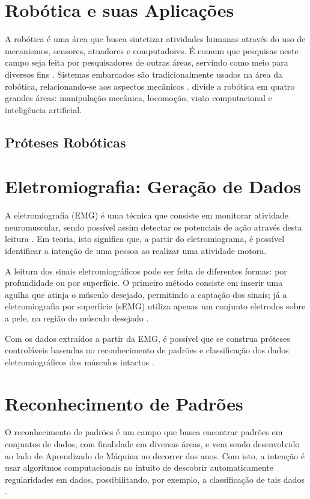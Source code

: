 \section{Robótica e suas Aplicações}
\label{sec:robotica}
A robótica é uma área que busca sintetizar atividades humanas através do uso de mecanismos, sensores, atuadores e computadores. É comum que pesquisas neste campo seja feita por pesquisadores de outras áreas, servindo como meio para diversos fins \cite{craig:2005}. Sistemas embarcados são tradicionalmente usados na área da robótica, relacionando-se aos aspectos mecânicos \cite{marwedel:2010}.  divide a robótica em quatro grandes áreas: manipulação mecânica, locomoção, visão computacional e inteligência artificial.

\subsection{Próteses Robóticas}


\section{Eletromiografia: Geração de Dados}
\label{sec:emg}
A eletromiografia (EMG) é uma técnica que consiste em monitorar atividade neuromuscular, sendo possível assim detectar os potenciais de ação através desta leitura \cite{deluca:1979}. Em teoria, isto significa que, a partir do eletromiograma, é possível identificar a intenção de uma pessoa ao realizar uma atividade motora.

A leitura dos sinais eletromiográficos pode ser feita de diferentes formas: por profundidade ou por superfície. O primeiro método consiste em inserir uma agulha que atinja o músculo desejado, permitindo a captação dos sinais; já a eletromiografia por superfície (sEMG) utiliza apenas um conjunto eletrodos sobre a pele, na região do músculo desejado \cite{FALTANDO}.

Com os dados extraídos a partir da EMG, é possível que se construa próteses controláveis baseadas no reconhecimento de padrões e classificação dos dados eletromiográficos dos músculos intactos \cite{park:1998}.



\section{Reconhecimento de Padrões}
\label{sec:patternrec}
O reconhecimento de padrões é um campo que busca encontrar padrões em conjuntos de dados, com finalidade em diversas áreas, e vem sendo desenvolvido ao lado de Aprendizado de Máquina no decorrer dos anos. Com isto, a intenção é usar algoritmos computacionais no intuito de descobrir automaticamente regularidades em dados, possibilitando, por exemplo, a classificação de tais dados \cite{bishop:2006}.

